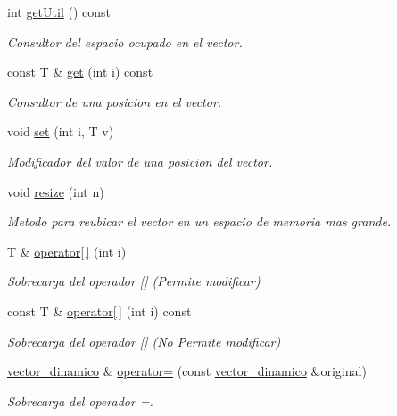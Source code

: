 \begin{DoxyCompactItemize}
int \hyperlink{classvector__dinamico_a0cae31353cf2dbcdc0dbd37dafdf52de}{get\+Util} () const
\begin{DoxyCompactList}\small\item\em Consultor del espacio ocupado en el vector. \end{DoxyCompactList}\item 
const T \& \hyperlink{classvector__dinamico_ae774d0b2ea36fe4c6bd225a6a7d5c6ec}{get} (int i) const
\begin{DoxyCompactList}\small\item\em Consultor de una posicion en el vector. \end{DoxyCompactList}\item 
void \hyperlink{classvector__dinamico_aacef86aaef4e738716884b60e8b3b723}{set} (int i, T v)
\begin{DoxyCompactList}\small\item\em Modificador del valor de una posicion del vector. \end{DoxyCompactList}\item 
void \hyperlink{classvector__dinamico_a7b8e98c5f43fd59ab0843f6f24b409d7}{resize} (int n)
\begin{DoxyCompactList}\small\item\em Metodo para reubicar el vector en un espacio de memoria mas grande. \end{DoxyCompactList}\item 
T \& \hyperlink{classvector__dinamico_a8ad7523a8d94986322dc71d0913c8535}{operator\mbox{[}$\,$\mbox{]}} (int i)
\begin{DoxyCompactList}\small\item\em Sobrecarga del operador \mbox{[}\mbox{]} (Permite modificar) \end{DoxyCompactList}\item 
const T \& \hyperlink{classvector__dinamico_a7e3f09d91df9c6008525f8d8737f743c}{operator\mbox{[}$\,$\mbox{]}} (int i) const
\begin{DoxyCompactList}\small\item\em Sobrecarga del operador \mbox{[}\mbox{]} (No Permite modificar) \end{DoxyCompactList}\item 
\hyperlink{classvector__dinamico}{vector\+\_\+dinamico} \& \hyperlink{classvector__dinamico_aa13f55271edd171d4dd4c203efb0c697}{operator=} (const \hyperlink{classvector__dinamico}{vector\+\_\+dinamico} \&original)
\begin{DoxyCompactList}\small\item\em Sobrecarga del operador =. \end{DoxyCompactList}\item 

\end{DoxyCompactItemize}
